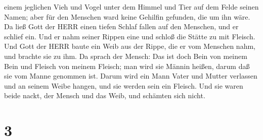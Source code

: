 einem jeglichen Vieh und Vogel unter dem Himmel und Tier auf dem Felde
seinen Namen; aber für den Menschen ward keine Gehilfin gefunden, die um
ihn wäre.  Da ließ Gott der HERR einen tiefen Schlaf fallen
auf den Menschen, und er schlief ein. Und er nahm seiner Rippen eine und
schloß die Stätte zu mit Fleisch.  Und Gott der HERR baute
ein Weib aus der Rippe, die er vom Menschen nahm, und brachte sie zu
ihm.  Da sprach der Mensch: Das ist doch Bein von meinem
Bein und Fleisch von meinem Fleisch; man wird sie Männin heißen, darum
daß sie vom Manne genommen ist.  Darum wird ein Mann Vater
und Mutter verlassen und an seinem Weibe hangen, und sie werden sein ein
Fleisch.  Und sie waren beide nackt, der Mensch und das
Weib, und schämten sich nicht.

\hypertarget{section-2}{%
\section{3}\label{section-2}}

